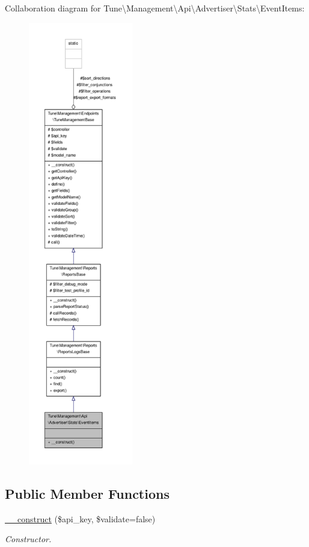 Collaboration diagram for Tune\textbackslash{}Management\textbackslash{}Api\textbackslash{}Advertiser\textbackslash{}Stats\textbackslash{}Event\-Items\-:
\nopagebreak
\begin{figure}[H]
\begin{center}
\leavevmode
\includegraphics[height=550pt]{classTune_1_1Management_1_1Api_1_1Advertiser_1_1Stats_1_1EventItems__coll__graph}
\end{center}
\end{figure}
\subsection*{Public Member Functions}
\begin{DoxyCompactItemize}
\item 
\hyperlink{classTune_1_1Management_1_1Api_1_1Advertiser_1_1Stats_1_1EventItems_a2df85aeb94c0ab29d2b76460687b776d}{\-\_\-\-\_\-construct} (\$api\-\_\-key, \$validate=false)
\begin{DoxyCompactList}\small\item\em Constructor. \end{DoxyCompactList}\end{DoxyCompactItemize}
